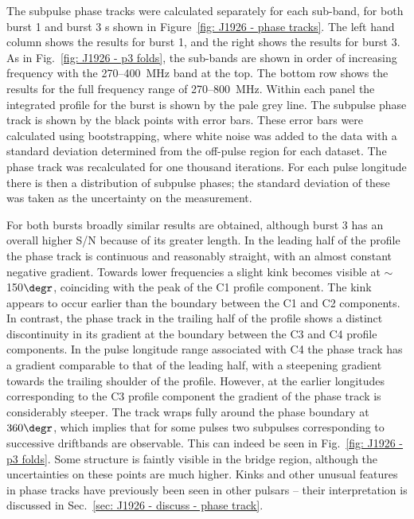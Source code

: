 The subpulse phase tracks were calculated separately for each sub-band, for both burst 1 and burst 3 s shown in Figure~\ref{fig: J1926 - phase tracks}. The left hand column shows the results for burst 1, and the right shows the results for burst 3. As in Fig.~\ref{fig: J1926 - p3 folds}, the sub-bands are shown in order of increasing frequency with the 270--400~MHz band at the top. The bottom row shows the results for the full frequency range of 270--800~MHz. Within each panel the integrated profile for the burst is shown by the pale grey line. The subpulse phase track is shown by the black points with error bars. These error bars were calculated using bootstrapping, where white noise was added to the data with a standard deviation determined from the off-pulse region for each dataset. The phase track was recalculated for one thousand iterations. For each pulse longitude there is then a distribution of subpulse phases; the standard deviation of these was taken as the uncertainty on the measurement.

For both bursts broadly similar results are obtained, although burst 3 has an overall higher S/N because of its greater length. In the leading half of the profile the phase track is continuous and reasonably straight, with an almost constant negative gradient. Towards lower frequencies a slight kink becomes visible at $\sim$150$\degr$, coinciding with the peak of the C1 profile component. The kink appears to occur earlier than the boundary between the C1 and C2 components. In contrast, the phase track in the trailing half of the profile shows a distinct discontinuity in its gradient at the boundary between the C3 and C4 profile components. In the pulse longitude range associated with C4 the phase track has a gradient comparable to that of the leading half, with a steepening gradient towards the trailing shoulder of the profile. However, at the earlier longitudes corresponding to the C3 profile component the gradient of the phase track is considerably steeper. The track wraps fully around the phase boundary at $360\degr$, which implies that for some pulses two subpulses corresponding to successive driftbands are observable. This can indeed be seen in Fig.~\ref{fig: J1926 - p3 folds}. Some structure is faintly visible in the bridge region, although the uncertainties on these points are much higher. Kinks and other unusual features in phase tracks have previously been seen in other pulsars -- their interpretation is discussed in Sec.~\ref{sec: J1926 - discuss - phase track}.

